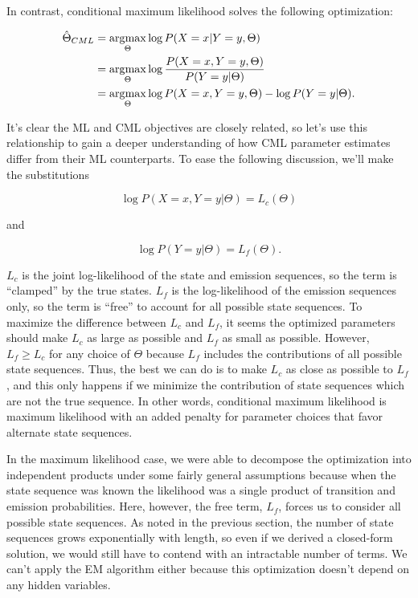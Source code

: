 In contrast, conditional maximum likelihood solves the following optimization:

\begin{align*}
\hat{\Theta}_{CML}
&= \operatorname*{arg\!\max}_\Theta \log P(X=x|Y=y, \Theta) \\
&= \operatorname*{arg\!\max}_\Theta \log \frac{P(X=x, Y=y, \Theta)}{P(Y=y|\Theta)} \\
&= \operatorname*{arg\!\max}_\Theta \log P(X=x, Y=y, \Theta) - \log P(Y=y|\Theta). \\
\end{align*}

It's clear the ML and CML objectives are closely related, so let's use this relationship to gain a deeper understanding of how CML parameter estimates differ from their ML counterparts. To ease the following discussion, we'll make the substitutions

\begin{equation*}
\log P(X=x, Y=y|\Theta) = L_c(\Theta)
\end{equation*}

and

\begin{equation*}
\log P(Y=y|\Theta) = L_f(\Theta).
\end{equation*}

$L_c$ is the joint log-likelihood of the state and emission sequences, so the term is ``clamped'' by the true states. $L_f$ is the log-likelihood of the emission sequences only, so the term is ``free'' to account for all possible state sequences. To maximize the difference between $L_c$ and $L_f$, it seems the optimized parameters should make $L_c$ as large as possible and $L_f$ as small as possible. However, $L_f \ge L_c$ for any choice of $\Theta$ because $L_f$ includes the contributions of all possible state sequences. Thus, the best we can do is to make $L_c$ as close as possible to $L_f$, and this only happens if we minimize the contribution of state sequences which are not the true sequence. In other words, conditional maximum likelihood is maximum likelihood with an added penalty for parameter choices that favor alternate state sequences.

In the maximum likelihood case, we were able to decompose the optimization into independent products under some fairly general assumptions because when the state sequence was known the likelihood was a single product of transition and emission probabilities. Here, however, the free term, $L_f$, forces us to consider all possible state sequences. As noted in the previous section, the number of state sequences grows exponentially with length, so even if we derived a closed-form solution, we would still have to contend with an intractable number of terms. We can't apply the EM algorithm either because this optimization doesn't depend on any hidden variables.

